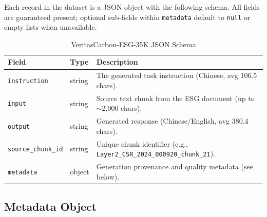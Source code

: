 Each record in the dataset is a JSON object with the following schema. All fields are guaranteed present; optional sub-fields within \texttt{metadata} default to \texttt{null} or empty lists when unavailable.

\begin{table}[h]
\centering
\caption{VeritasCarbon-ESG-35K JSON Schema}
\label{tab:schema}
\small
\begin{tabular}{@{}p{2.8cm}p{2cm}p{6.5cm}@{}}
\toprule
\textbf{Field} & \textbf{Type} & \textbf{Description} \\
\midrule
\texttt{instruction} & string & The generated task instruction (Chinese, avg 106.5 chars). \\
\texttt{input} & string & Source text chunk from the ESG document (up to $\sim$2,000 chars). \\
\texttt{output} & string & Generated response (Chinese/English, avg 380.4 chars). \\
\texttt{source\_chunk\_id} & string & Unique chunk identifier (e.g., \texttt{Layer2\_CSR\_2024\_000920\_chunk\_21}). \\
\texttt{metadata} & object & Generation provenance and quality metadata (see below). \\
\bottomrule
\end{tabular}
\end{table}

\subsection*{Metadata Object}

